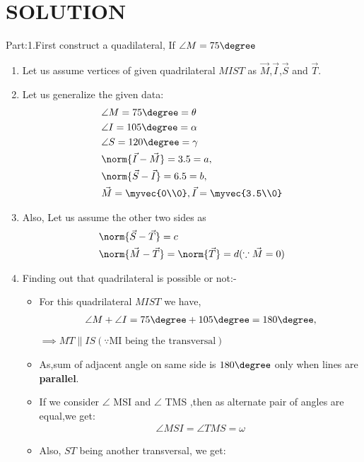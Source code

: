 \documentclass[journal,12pt,twocolumn]{IEEEtran}
\begin{document}
\section{SOLUTION}
Part:1.First construct a quadilateral, If $\angle M=75\degree$
\begin{enumerate}
\item Let us assume vertices of given quadrilateral $MIST$ as $\vec{M}$,$\vec{I}$,$\vec{S}$ and $\vec{T}$.
\item Let us generalize the given data:
    \begin{align}
    &\angle M= 75\degree=\theta \label{eq1}
    \\
    &\angle I= 105\degree=\alpha
    \\
    &\angle S= 120\degree=\gamma \label{eq2}
    \\
    &\norm{\vec{I}-\vec{M}} =3.5=a, \label{eq3}
    \\
    &\norm{\vec{S}-\vec{I}} =6.5=b,\label{eq4}
    \\
    &\vec{M}=\myvec{0\\0}, \vec{I}=\myvec{3.5\\0}
    \end{align}
\item Also, Let us assume the other two sides as
\begin{align}
 &\norm{\vec{S}-\vec{T}}=c \label{eq5}
 \\
  &\norm{\vec{M}-\vec{T}}=\norm{\vec{T}} =d \label{eq6} (\because \vec{M}=0)
\end{align}  
\item Finding out that quadrilateral is possible or not:-
\begin{itemize}
\item For this quadrilateral $MIST$ we have,
\begin{align}
\angle M +\angle I = 75\degree + 105\degree =180\degree,
\end{align}
$ \implies MT \parallel IS (\because \text {MI being the transversal})$
\\
\item As,sum of adjacent angle on same side is $180\degree$ only when lines are \textbf{parallel}.
\item If we consider $\angle$ MSI and $\angle$  TMS ,then as alternate pair of angles are equal,we get:
\begin{align}
\angle MSI = \angle TMS =\omega \label{eq7}
\end{align}
\item Also, $ST$ being another transversal, we get:

\end{itemize}
\end{enumerate}
\end{document}
